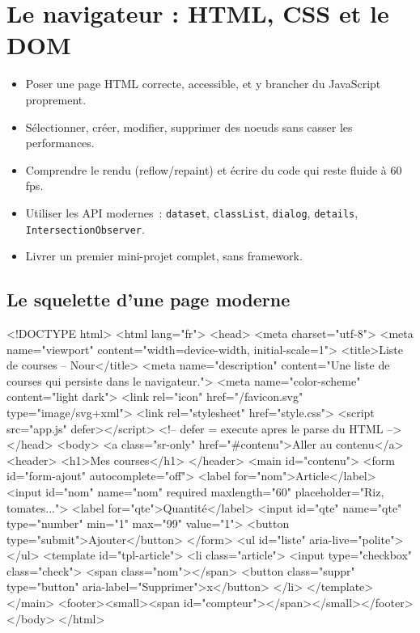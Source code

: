\chapter{Le navigateur : HTML, CSS et le DOM}
\label{ch-js-dom}

\begin{objectif}
\begin{itemize}
  \item Poser une page HTML correcte, accessible, et y brancher du JavaScript proprement.
  \item S\'electionner, cr\'eer, modifier, supprimer des noeuds sans casser les performances.
  \item Comprendre le rendu (reflow/repaint) et \'ecrire du code qui reste fluide \`a 60 fps.
  \item Utiliser les API modernes~: \texttt{dataset}, \texttt{classList}, \texttt{dialog},
        \texttt{details}, \texttt{IntersectionObserver}.
  \item Livrer un premier mini-projet complet, sans framework.
\end{itemize}
\end{objectif}

\section{Le squelette d'une page moderne}

\begin{codeplain}
<!DOCTYPE html>
<html lang="fr">
<head>
  <meta charset="utf-8">
  <meta name="viewport" content="width=device-width, initial-scale=1">
  <title>Liste de courses -- Nour</title>
  <meta name="description" content="Une liste de courses qui persiste dans le navigateur.">
  <meta name="color-scheme" content="light dark">
  <link rel="icon" href="/favicon.svg" type="image/svg+xml">
  <link rel="stylesheet" href="style.css">
  <script src="app.js" defer></script>            <!-- defer = execute apres le parse du HTML -->
</head>
<body>
  <a class="sr-only" href="#contenu">Aller au contenu</a>
  <header>
    <h1>Mes courses</h1>
  </header>
  <main id="contenu">
    <form id="form-ajout" autocomplete="off">
      <label for="nom">Article</label>
      <input id="nom" name="nom" required maxlength="60" placeholder="Riz, tomates...">
      <label for="qte">Quantit\'e</label>
      <input id="qte" name="qte" type="number" min="1" max="99" value="1">
      <button type="submit">Ajouter</button>
    </form>
    <ul id="liste" aria-live="polite"></ul>
    <template id="tpl-article">
      <li class="article">
        <input type="checkbox" class="check">
        <span class="nom"></span>
        <button class="suppr" type="button" aria-label="Supprimer">x</button>
      </li>
    </template>
  </main>
  <footer><small><span id="compteur"></span></small></footer>
</body>
</html>
\end{codeplain}

